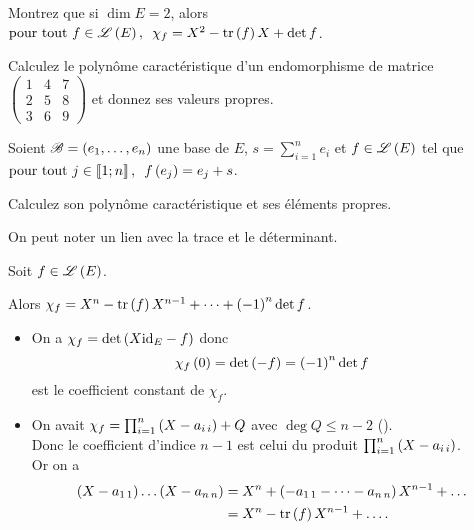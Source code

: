 \begin{exo}
Montrez que si \(\dim E=2\), alors \(\quantifs{\tpt f\in\Lendo{E}}\chi_f=X^2-\tr\paren{f}X+\det f\).
\end{exo}

\begin{exo}
Calculez le polynôme caractéristique d'un endomorphisme de matrice \(\begin{pmatrix}
1 & 4 & 7 \\
2 & 5 & 8 \\
3 & 6 & 9
\end{pmatrix}\) et donnez ses valeurs propres.
\end{exo}

\begin{exo}
Soient \(\mathscr{B}=\left(e_1,\dots,e_n\right)\) une base de \(E\), \(s=\sum_{i=1}^ne_i\) et \(f\in\mathscr{L}\left(E\right)\) tel que \(\quantifs{\tpt j\in\interventierii{1}{n}}f\paren{e_j}=e_j+s\).

Calculez son polynôme caractéristique et ses éléments propres.
\end{exo}

On peut noter un lien avec la trace et le déterminant.

\begin{prop}
Soit \(f\in\mathscr{L}\left(E\right)\).

Alors \(\chi_f=X^n-\operatorname{tr}\left(f\right)X^{n-1}+\dots+\left(-1\right)^n\det f\).
\end{prop}

\begin{dem}
\begin{itemize}
    \item On a \(\chi_f=\det\left(X\mathrm{id}_{E}-f\right)\) donc \[\chi_f\left(0\right)=\det\left(-f\right)=\left(-1\right)^n\det f\] est le coefficient constant de \(\chi_f\). \\
    \item On avait \(\chi_f=\prod_{i=1}^n\left(X-a_{i\,i}\right)+Q\) avec \(\deg Q\leq n-2\) (\cf {}). \\ Donc le coefficient d'indice \(n-1\) est celui du produit \(\prod_{i=1}^n\left(X-a_{i\,i}\right)\). \\ Or on a \[\begin{aligned}
        \left(X-a_{1\,1}\right)\dots\left(X-a_{n\,n}\right)&=X^n+\left(-a_{1\,1}-\dots-a_{n\,n}\right)X^{n-1}+\dots \\
        &=X^n-\operatorname{tr}\left(f\right)X^{n-1}+\dots.
    \end{aligned}\]
\end{itemize}
\end{dem}

